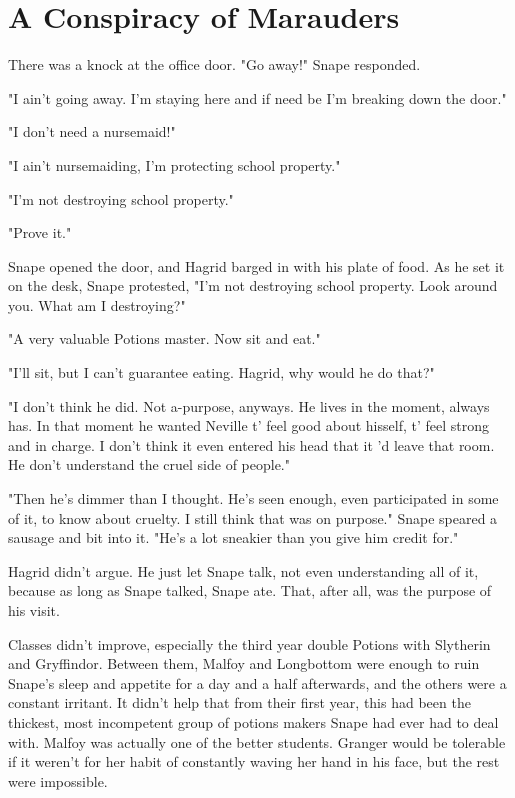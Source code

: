 
\chapter{A Conspiracy of Marauders}


There was a knock at the office door. "Go away!" Snape responded.

"I ain't going away. I'm staying here and if need be I'm breaking down the door."

"I don't need a nursemaid!"

"I ain't nursemaiding, I'm protecting school property."

"I'm not destroying school property."

"Prove it."

Snape opened the door, and Hagrid barged in with his plate of food. As he set it on the desk, Snape protested, "I'm not destroying school property. Look around you. What am I destroying?"

"A very valuable Potions master. Now sit and eat."

"I'll sit, but I can't guarantee eating. Hagrid, why would he do that?"

"I don't think he did. Not a-purpose, anyways. He lives in the moment, always has. In that moment he wanted Neville t' feel good about hisself, t' feel strong and in charge. I don't think it even entered his head that it 'd leave that room. He don't understand the cruel side of people."

"Then he's dimmer than I thought. He's seen enough, even participated in some of it, to know about cruelty. I still think that was on purpose." Snape speared a sausage and bit into it. "He's a lot sneakier than you give him credit for."

Hagrid didn't argue. He just let Snape talk, not even understanding all of it, because as long as Snape talked, Snape ate. That, after all, was the purpose of his visit.

Classes didn't improve, especially the third year double Potions with Slytherin and Gryffindor. Between them, Malfoy and Longbottom were enough to ruin Snape's sleep and appetite for a day and a half afterwards, and the others were a constant irritant. It didn't help that from their first year, this had been the thickest, most incompetent group of potions makers Snape had ever had to deal with. Malfoy was actually one of the better students. Granger would be tolerable if it weren't for her habit of constantly waving her hand in his face, but the rest were impossible.

